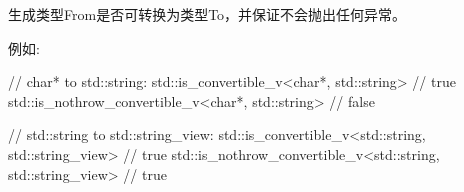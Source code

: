 




生成类型From是否可转换为类型To，并保证不会抛出任何异常。

例如:

\begin{cpp}
// char* to std::string:
std::is_convertible_v<char*, std::string> // true
std::is_nothrow_convertible_v<char*, std::string> // false

// std::string to std::string_view:
std::is_convertible_v<std::string, std::string_view> // true
std::is_nothrow_convertible_v<std::string, std::string_view> // true
\end{cpp}







